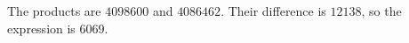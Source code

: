 The products are $4098600$ and $4086462$. Their difference is $12138$, so the expression is $\boxed{6069}$.
